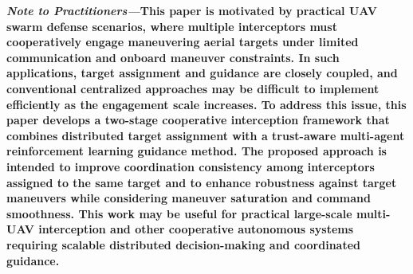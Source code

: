 \documentclass[lettersize,journal]{IEEEtran}
\begin{document}
\begin{abstract}
The swarm attack of unmanned aerial vehicles (UAVs) poses a significant threat to future
battlefield operations.
Achieving efficient and precise cooperative interception against attacking UAV swarms with
highly dynamic maneuvering capabilities and adaptive penetration strategies poses a critical
challenge for UAV interceptor swarms.
This study addresses the cooperative interception of maneuvering targets in swarm attacks by
decomposing the problem into two key tasks: target assignment and cooperative interception
guidance.
For target assignment, an Improved Dung Beetle Optimization (IDBO) algorithm is proposed to
dynamically balance exploration and exploitation, achieving highly efficient and rapid
assignments.
For cooperative interception guidance, an Attention-Residual and Trust-aware Multi-Agent Proximal Policy Optimization (ART-MAPPO) framework is developed to achieve precise and time-coordinated interception of adversarial UAV swarms employing advanced penetration strategies.
The simulation results validate the effectiveness of the proposed intelligent cooperative
interception method, demonstrating superior convergence speed, robustness, and significantly
improved interception success rates in swarm UAV cooperative interception scenarios.
\end{abstract}

{\linespread{0.9}\selectfont
\hspace*{0.0em}\textbf{\textit{Note to Practitioners—}}\textbf{This paper is motivated by practical UAV swarm defense scenarios, where multiple interceptors must cooperatively engage maneuvering aerial targets under limited communication and onboard maneuver constraints. In such applications, target assignment and guidance are closely coupled, and conventional centralized approaches may be difficult to implement efficiently as the engagement scale increases. To address this issue, this paper develops a two-stage cooperative interception framework that combines distributed target assignment with a trust-aware multi-agent reinforcement learning guidance method. The proposed approach is intended to improve coordination consistency among interceptors assigned to the same target and to enhance robustness against target maneuvers while considering maneuver saturation and command smoothness. This work may be useful for practical large-scale multi-UAV interception and other cooperative autonomous systems requiring scalable distributed decision-making and coordinated guidance.}\par\vspace{0.5\baselineskip}
}
\end{document}
